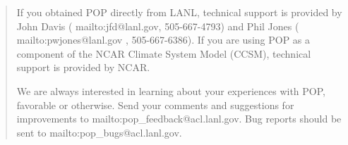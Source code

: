 \documentclass[12,twoside,openright]{report}
\begin{document}
\begin{abstract}
If you obtained POP directly from LANL, technical support is
provided by
John Davis (
                  {mailto:jfd@lanl.gov}, 505-667-4793)
and Phil Jones (
                {mailto:pwjones@lanl.gov}
                , 505-667-6386).
If you are using POP as a component of the NCAR Climate System Model
(CCSM), technical support is provided by NCAR.

We are always interested in learning about your experiences
with POP, favorable or otherwise. Send your comments and
suggestions for improvements to
                  {mailto:pop_feedback@acl.lanl.gov}.
Bug reports should be sent to
                  {mailto:pop_bugs@acl.lanl.gov}.

\end{abstract}

\tableofcontents
\listoffigures
\listoftables








\end{document}
